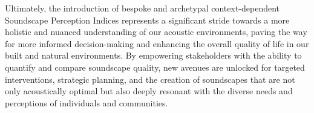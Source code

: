 \documentclass[
  authoryear,
  preprint,
  3p]{elsarticle}
\begin{document}
Ultimately, the introduction of bespoke and archetypal context-dependent
Soundscape Perception Indices represents a significant stride towards a
more holistic and nuanced understanding of our acoustic environments,
paving the way for more informed decision-making and enhancing the
overall quality of life in our built and natural environments. By
empowering stakeholders with the ability to quantify and compare
soundscape quality, new avenues are unlocked for targeted interventions,
strategic planning, and the creation of soundscapes that are not only
acoustically optimal but also deeply resonant with the diverse needs and
perceptions of individuals and communities.


\renewcommand\refname{References}
  
\end{document}
